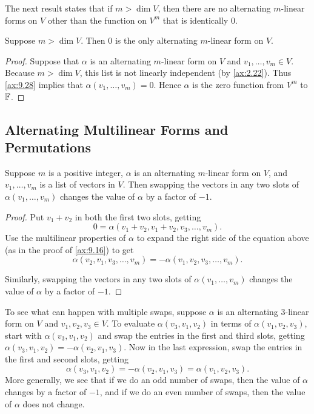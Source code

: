 The next result states that if $m>\dim V$, then there are no alternating
$m$-linear forms on $V$ other than the function on $V^m$ that is identically
$0$.

\begin{result}\label{ax:9.29}
Suppose $m>\dim V$. Then $0$ is the only alternating $m$-linear form on $V$.
\end{result}

\begin{proof}
Suppose that $\alpha$ is an alternating $m$-linear form on $V$ and
$v_1,\dots,v_m\in V$. Because $m>\dim V$, this list is not linearly
independent (by \ref{ax:2.22}). Thus \ref{ax:9.28} implies that
$\alpha(v_1,\dots,v_m)=0$. Hence $\alpha$ is the zero function from $V^m$ to
$\mathbb{F}$.
\end{proof}

\subsection{Alternating Multilinear Forms and Permutations}

\begin{result}\label{ax:9.30}
Suppose $m$ is a positive integer, $\alpha$ is an alternating $m$-linear form
on $V$, and $v_1,\dots,v_m$ is a list of vectors in $V$. Then swapping the
vectors in any two slots of $\alpha(v_1,\dots,v_m)$ changes the value of
$\alpha$ by a factor of $-1$.
\end{result}

\begin{proof}
Put $v_1+v_2$ in both the first two slots, getting
\[ 0 = \alpha(v_1+v_2,v_1+v_2,v_3,\dots,v_m). \]
Use the multilinear properties of $\alpha$ to expand the right side of the
equation above (as in the proof of \ref{ax:9.16}) to get
\[ \alpha(v_2,v_1,v_3,\dots,v_m) = -\alpha(v_1,v_2,v_3,\dots,v_m). \]

Similarly, swapping the vectors in any two slots of $\alpha(v_1,\dots,v_m)$
changes the value of $\alpha$ by a factor of $-1$.
\end{proof}

To see what can happen with multiple swaps, suppose $\alpha$ is an alternating
$3$-linear form on $V$ and $v_1,v_2,v_3\in V$. To evaluate
$\alpha(v_3,v_1,v_2)$ in terms of $\alpha(v_1,v_2,v_3)$, start with
$\alpha(v_3,v_1,v_2)$ and swap the entries in the first and third slots,
getting
$\alpha(v_3,\allowbreak v_1,v_2)=-\alpha(v_2,v_1,v_3)$. Now in the last
expression, swap the entries in the first and second slots, getting
\[ \alpha(v_3,v_1,v_2) = -\alpha(v_2,v_1,v_3) = \alpha(v_1,v_2,v_3). \]
More generally, we see that if we do an odd number of swaps, then the value of
$\alpha$ changes by a factor of $-1$, and if we do an even number of swaps,
then the value of $\alpha$ does not change.

